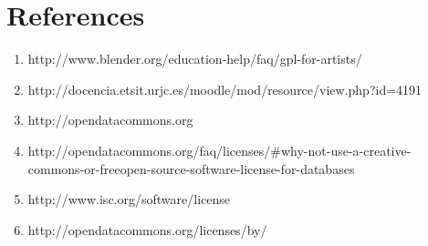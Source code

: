 \documentclass[11pt]{article}
\begin{document}
\section{References}
\begin{enumerate}
  \item \label{itm:01ref} http://www.blender.org/education-help/faq/gpl-for-artists/
  \item \label{itm:02ref} http://docencia.etsit.urjc.es/moodle/mod/resource/view.php?id=4191
  \item \label{itm:03ref} http://opendatacommons.org
  \item \label{itm:04ref} http://opendatacommons.org/faq/licenses/\#why-not-use-a-creative-commons-or-freeopen-source-software-license-for-databases
  \item \label{itm:05ref} http://www.isc.org/software/license
  \item \label{itm:06ref} http://opendatacommons.org/licenses/by/

\end{enumerate}
\end{document}
